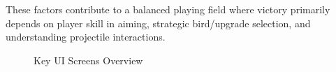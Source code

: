 \documentclass[11pt, a4paper]{article}
\begin{document}
These factors contribute to a balanced playing field where victory primarily depends on player skill in aiming, strategic bird/upgrade selection, and understanding projectile interactions.


\begin{figure}[H]

  \centering
  
  \hfill
  
  \vspace{1em}
  
  \hfill
  
  \caption{Key UI Screens Overview}
  
  \label{fig:ui_overview_a}

\end{figure}
\end{document}
